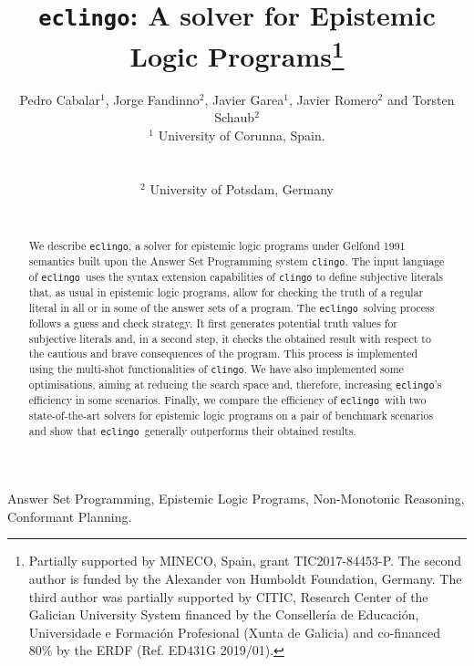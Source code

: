 \documentclass{new_tlp}
\def\eclingo{{\tt eclingo}}
\def\clingo{{\tt clingo}}
\begin{document}
\submitted{}
\revised{}
\accepted{}
\title[A solver for Epistemic Logic Programs]
    {\eclingo: A solver for Epistemic Logic Programs\thanks{Partially supported by MINECO, Spain, grant TIC2017-84453-P.
    The second author is funded by the Alexander von Humboldt Foundation, Germany. The third author was partially supported by CITIC, Research Center of the Galician University System financed by the Conseller\'{i}a de Educaci\'on, Universidade e Formaci\'on Profesional (Xunta de Galicia) and co-financed 80\% by the ERDF (Ref. ED431G 2019/01).}}

  \author[P. Cabalar, J. Fandinno, J. Garea, J. Romero and T. Schaub]
         {Pedro Cabalar$^1$, Jorge Fandinno$^2$, Javier Garea$^1$, Javier Romero$^2$ and Torsten Schaub$^2$\\
          $^1$ University of Corunna, Spain.\\
          {}\\\\
          $^2$ University of Potsdam, Germany\\
          {}\\
        }



%
\maketitle

\begin{abstract}
We describe \eclingo, a solver for epistemic logic programs under Gelfond 1991 semantics built upon the Answer Set Programming system \clingo.
The input language of \eclingo\ uses the syntax extension capabilities of \clingo{} to define subjective literals that, as usual in
epistemic logic programs, allow for checking the truth of a regular literal in all or in some of the answer sets of a program.
The \eclingo\ solving process follows a guess and check strategy.
It first generates potential truth values for subjective literals and, in a second step, it checks the obtained result with respect to the cautious and brave consequences of the program.
This process is implemented using the multi-shot functionalities of \clingo.
We have also implemented some optimisations, aiming at reducing the search space and, therefore, increasing \eclingo's efficiency in some scenarios.
Finally, we compare the efficiency of \eclingo\ with two state-of-the-art solvers for epistemic logic programs on a pair of benchmark scenarios
and show that \eclingo\ generally outperforms their obtained results.
\end{abstract}
\begin{keywords}
Answer Set Programming, Epistemic Logic Programs, Non-Monotonic Reasoning, Conformant Planning.
\end{keywords}
\end{document}
